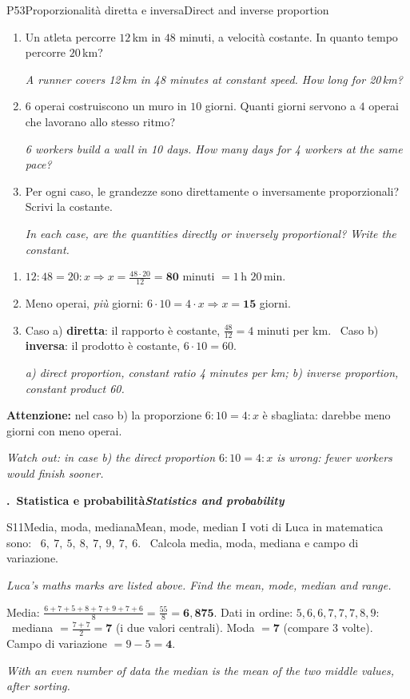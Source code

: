 \documentclass[11pt,a4paper]{article}
\newcommand{\en}[1]{\par{\small\itshape\color{engray}#1\par}}
\newcounter{sezione}
\newcommand{\sezione}[2]{%
  \par\addvspace{14pt}\Needspace{10\baselineskip}%
  \refstepcounter{sezione}%
  \noindent\begin{tcolorbox}[enhanced, colback=navy, colframe=navy, sharp corners,
      left=6pt, right=6pt, top=3pt, bottom=3pt, boxsep=0pt, before skip=0pt, after skip=6pt]
    {\color{white}\large\bfseries \thesezione.\ #1\hfill{\normalsize\itshape #2}}
  \end{tcolorbox}\par}
\newcommand{\errore}[2]{\begin{attenzione}\textbf{\color{fgA}Attenzione:} #1\par
  {\itshape\color{engray}Watch out: #2}\end{attenzione}}
\begin{document}
\begin{esercizio}{P5}{3}{Proporzionalità diretta e inversa}{Direct and inverse proportion}
\begin{enumerate}
\item Un atleta percorre $12$\,km in $48$ minuti, a velocità costante. In quanto tempo percorre $20$\,km?
\en{A runner covers 12\,km in 48 minutes at constant speed. How long for 20\,km?}
\item $6$ operai costruiscono un muro in $10$ giorni. Quanti giorni servono a $4$ operai che lavorano allo stesso ritmo?
\en{6 workers build a wall in 10 days. How many days for 4 workers at the same pace?}
\item Per ogni caso, le grandezze sono direttamente o inversamente proporzionali? Scrivi la costante.
\en{In each case, are the quantities directly or inversely proportional? Write the constant.}
\end{enumerate}
\end{esercizio}
\begin{solbox}
\begin{enumerate}
\item $12:48=20:x\Rightarrow x=\frac{48\cdot20}{12}=\mathbf{80}$ minuti $=1$\,h $20$\,min.
\item Meno operai, \emph{più} giorni: $6\cdot10=4\cdot x\Rightarrow x=\mathbf{15}$ giorni.
\item Caso a) \textbf{diretta}: il rapporto è costante, $\frac{48}{12}=4$ minuti per km. \ Caso b) \textbf{inversa}: il prodotto è costante, $6\cdot10=60$.
\en{a) direct proportion, constant ratio 4 minutes per km; b) inverse proportion, constant product 60.}
\end{enumerate}
\errore{nel caso b) la proporzione $6:10=4:x$ è sbagliata: darebbe meno giorni con meno operai.}
{in case b) the direct proportion $6:10=4:x$ is wrong: fewer workers would finish sooner.}
\end{solbox}

\sezione{Statistica e probabilità}{Statistics and probability}

\begin{esercizio}{S1}{1}{Media, moda, mediana}{Mean, mode, median}
I voti di Luca in matematica sono: \ $6,\ 7,\ 5,\ 8,\ 7,\ 9,\ 7,\ 6$. \ Calcola media, moda, mediana e campo di variazione.
\en{Luca's maths marks are listed above. Find the mean, mode, median and range.}
\end{esercizio}
\begin{solbox}
Media: $\frac{6+7+5+8+7+9+7+6}{8}=\frac{55}{8}=\mathbf{6,875}$.\quad
Dati in ordine: $5,6,6,7,7,7,8,9$: \ mediana $=\frac{7+7}{2}=\mathbf{7}$ (i due valori centrali).\quad
Moda $=\mathbf{7}$ (compare 3 volte).\quad
Campo di variazione $=9-5=\mathbf{4}$.
\en{With an even number of data the median is the mean of the two middle values, after sorting.}
\end{solbox}
\end{document}
